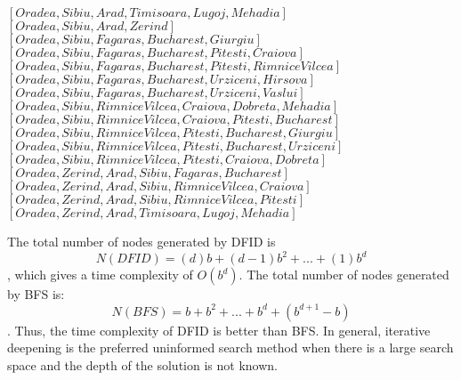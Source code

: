\documentclass{article}%
\begin{document}
\begin{enumerate}
\begin{enumerate}
\begin{itemize}
\begin{itemize}
			$\left[ Oradea, Sibiu, Arad,Timisoara, Lugoj, Mehadia \right]$ \\ 
			$\left[ Oradea, Sibiu, Arad,Zerind \right]$ \\ 
			$ \left[ Oradea, Sibiu, Fagaras, Bucharest, Giurgiu \right]$ \\ 
			$\left[ Oradea, Sibiu, Fagaras, Bucharest, Pitesti, Craiova\right]$ \\ 
			$\left[ Oradea, Sibiu, Fagaras, Bucharest, Pitesti, Rimnice Vilcea\right]$ \\ 
			$ \left[ Oradea, Sibiu, Fagaras, Bucharest, Urziceni, Hirsova\right]$ \\
			$ \left[ Oradea, Sibiu, Fagaras, Bucharest, Urziceni, Vaslui\right]$ \\
			$ \left[ Oradea, Sibiu, Rimnice Vilcea, Craiova,Dobreta,Mehadia \right]$ \\ 
			$ \left[ Oradea, Sibiu, Rimnice Vilcea, Craiova,Pitesti, Bucharest \right]$ \\ 
			$\left[ Oradea, Sibiu, Rimnice Vilcea, Pitesti, Bucharest, Giurgiu \right] $ \\
			$\left[ Oradea, Sibiu, Rimnice Vilcea, Pitesti, Bucharest, Urziceni \right] $ \\
			$\left[ Oradea, Sibiu, Rimnice Vilcea, Pitesti, Craiova, Dobreta \right]$ \\
			$ \left[ Oradea, Zerind, Arad, Sibiu, Fagaras, Bucharest\right]$ \\ 
			$\left[ Oradea, Zerind, Arad, Sibiu, Rimnice Vilcea, Craiova\right]$ \\
			$\left[ Oradea, Zerind, Arad, Sibiu, Rimnice Vilcea, Pitesti\right]$ \\
			$\left[ Oradea, Zerind, Arad, Timisoara, Lugoj,Mehadia\right] $ 
			\end{itemize}
		\end{itemize}
	
		The total number of nodes generated by DFID is 
$$N(DFID) = (d) b + (d - 1)b^2 + . . . + (1) b^d$$, which gives a time complexity of $O(b^d)$. 
	The total number of nodes generated by BFS is:
$$N(BFS) = b + b^2 + . . . + b^d + (b^{d+1} - b)$$ . Thus, the time complexity of DFID is better than BFS. In general, iterative deepening is the preferred uninformed search method when there is a
large search space and the depth of the solution is not known.
	
	\end{enumerate}

\end{enumerate}
\end{document}
